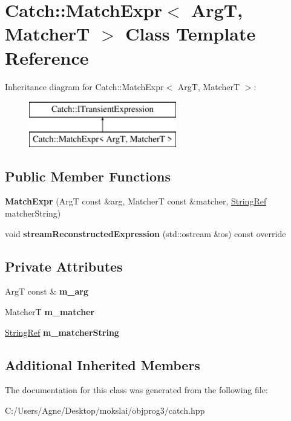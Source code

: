 \hypertarget{class_catch_1_1_match_expr}{}\section{Catch\+:\+:Match\+Expr$<$ ArgT, MatcherT $>$ Class Template Reference}
\label{class_catch_1_1_match_expr}
Inheritance diagram for Catch\+:\+:Match\+Expr$<$ ArgT, MatcherT $>$\+:\begin{figure}[H]
\begin{center}
\leavevmode
\includegraphics[height=2.000000cm]{class_catch_1_1_match_expr}
\end{center}
\end{figure}
\subsection*{Public Member Functions}
\begin{DoxyCompactItemize}
\item 
\mbox{\label{class_catch_1_1_match_expr_ab5b9ecc4fb9e91f5f48756e75affe93d}} 
{\bfseries Match\+Expr} (ArgT const \&arg, MatcherT const \&matcher, \mbox{\hyperlink{class_catch_1_1_string_ref}{String\+Ref}} matcher\+String)
\item 
\mbox{\label{class_catch_1_1_match_expr_ad3e41adb597750b2219bb37e51185629}} 
void {\bfseries stream\+Reconstructed\+Expression} (std\+::ostream \&os) const override
\end{DoxyCompactItemize}
\subsection*{Private Attributes}
\begin{DoxyCompactItemize}
\item 
\mbox{\label{class_catch_1_1_match_expr_afb77e2fbf49f956d27f8617a70cf7118}} 
ArgT const  \& {\bfseries m\+\_\+arg}
\item 
\mbox{\label{class_catch_1_1_match_expr_a4dea78586dd2b3268b4a186e7c0adbe2}} 
MatcherT {\bfseries m\+\_\+matcher}
\item 
\mbox{\label{class_catch_1_1_match_expr_a33ec706994f744ff1f4a549177ec08f9}} 
\mbox{\hyperlink{class_catch_1_1_string_ref}{String\+Ref}} {\bfseries m\+\_\+matcher\+String}
\end{DoxyCompactItemize}
\subsection*{Additional Inherited Members}


The documentation for this class was generated from the following file\+:\begin{DoxyCompactItemize}
\item 
C\+:/\+Users/\+Agne/\+Desktop/mokslai/objprog3/catch.\+hpp\end{DoxyCompactItemize}
